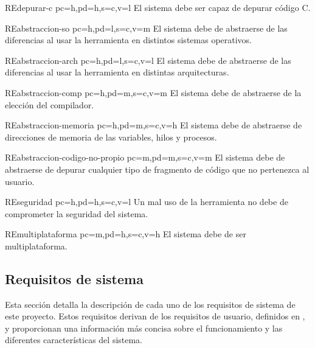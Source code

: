 \begin{userReq}{RE}{depurar-c}
    {pc=h,pd=h,s=c,v=l}
    El sistema debe ser capaz de depurar código C.
\end{userReq}

\begin{userReq}{RE}{abstraccion-so}
    {pc=h,pd=l,s=c,v=m}
    El sistema debe de abstraerse de las diferencias al usar la herramienta en distintos sistemas operativos.
\end{userReq}

\begin{userReq}{RE}{abstraccion-arch}
    {pc=h,pd=l,s=c,v=l}
    El sistema debe de abstraerse de las diferencias al usar la herramienta en distintas arquitecturas.
\end{userReq}

\begin{userReq}{RE}{abstraccion-comp}
    {pc=h,pd=m,s=c,v=m}
    El sistema debe de abstraerse de la elección del compilador.
\end{userReq}

\begin{userReq}{RE}{abstraccion-memoria}
    {pc=h,pd=m,s=c,v=h}
    El sistema debe de abstraerse de direcciones de memoria de las variables, hilos y procesos.
\end{userReq}

\begin{userReq}{RE}{abstraccion-codigo-no-propio}
    {pc=m,pd=m,s=c,v=m}
    El sistema debe de abstraerse de depurar cualquier tipo de fragmento de código que no pertenezca al usuario.
\end{userReq}

\begin{userReq}{RE}{seguridad}
    {pc=h,pd=h,s=c,v=l}
    Un mal uso de la herramienta no debe de comprometer la seguridad del sistema.
\end{userReq}

\begin{userReq}{RE}{multiplataforma}
    {pc=m,pd=h,s=c,v=h}
    El sistema debe de ser multiplataforma.
\end{userReq}

\FloatBarrier

\subsection{Requisitos de sistema}\label{subsec:requisitos-sistema}

Esta sección detalla la descripción de cada uno de los requisitos de sistema de este proyecto. Estos requisitos derivan de los requisitos de usuario, definidos en , y proporcionan una información más concisa sobre el funcionamiento y las diferentes características del sistema.

